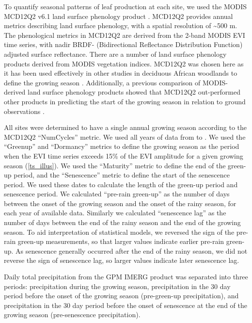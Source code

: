 \documentclass[11pt,a4paper]{article}
\begin{document}
To quantify seasonal patterns of leaf production at each site, we used the
MODIS MCD12Q2 v6.1 land surface phenology product \citet{MCD12Q2}. MCD12Q2
provides annual metrics describing land surface phenology, with a spatial
resolution of \textasciitilde{500 m}. The phenological metrics in MCD12Q2 are
derived from the 2-band MODIS EVI time series, with nadir BRDF- (Bidirectional
Reflectance Distribution Function) adjusted surface reflectance. There are a
number of land surface phenology products derived from MODIS vegetation
indices. MCD12Q2 was chosen here as it has been used effectively in other
studies in deciduous African woodlands to define the growing season
\citep{Begue2014, Adole2018b}. Additionally, a previous comparison of
MODIS-derived land surface phenology products showed that MCD12Q2 out-performed
other products in predicting the start of the growing season in relation to
ground observations \citep{Peng2017}. 

All sites were determined to have a single annual growing season according to
the MCD12Q2 ``NumCycles'' metric. We used all years of data from \modisStart{}
to \modisEnd{}. We used the ``Greenup'' and ``Dormancy'' metrics to define the
growing season as the period when the EVI time series exceeds 15\% of the EVI
amplitude for a given growing season (\autoref{ts_illus}). We used the
``Maturity'' metric to define the end of the green-up period, and the
``Senescence'' metric to define the start of the senescence period. We used
these dates to calculate the length of the green-up period and senescence
period. We calculated ``pre-rain green-up'' as the number of days between the
onset of the growing season and the onset of the rainy season, for each year of
available data. Similarly we calculated ``senescence lag'' as the number of
days between the end of the rainy season and the end of the growing season. To
aid interpretation of statistical models, we reversed the sign of the pre-rain
green-up measurements, so that larger values indicate earlier pre-rain
green-up. As senescence generally occurred after the end of the rainy season,
we did not reverse the sign of senescence lag, so larger values indicate later
senescence lag. 

Daily total precipitation from the GPM IMERG product was separated into three
periods: precipitation during the growing season, precipitation in the 30 day
period before the onset of the growing season (pre-green-up precipitation), and
precipitation in the 30 day period before the onset of senescence at the end of
the growing season (pre-senescence precipitation). 
\end{document}
